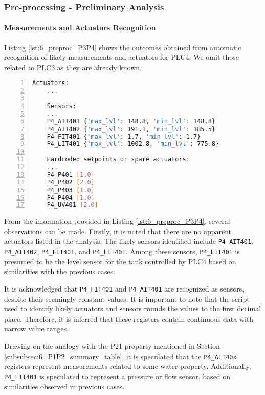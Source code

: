 \subsubsection{Pre-processing - Preliminary Analysis}
\label{subsubsec:6_P3P4_preprocessing}

\paragraph{Measurements and Actuators Recognition}
\label{par:6_P3P4_measures_actuators_recognition}

Listing \ref{lst:6_preproc_P3P4} shows the outcomes obtained from automatic recognition of likely measurements and actuators for PLC4. We omit those related to PLC3 as they are already known.

\begin{lstlisting}[language=bash, numbers=left, caption=Preliminary analysis outcomes for sensors and actuators of \texttt{PLC3-4}, label=lst:6_preproc_P3P4]
	Actuators: 
	...
	
	Sensors: 
	...
	P4_AIT401 {'max_lvl': 148.8, 'min_lvl': 148.8}
	P4_AIT402 {'max_lvl': 191.1, 'min_lvl': 185.5}
	P4_FIT401 {'max_lvl': 1.7, 'min_lvl': 1.7}
	P4_LIT401 {'max_lvl': 1002.8, 'min_lvl': 775.8}
	
	Hardcoded setpoints or spare actuators: 
	...
	P4_P401 [1.0]
	P4_P402 [2.0]
	P4_P403 [1.0]
	P4_P404 [1.0]
	P4_UV401 [2.0]
\end{lstlisting}

From the information provided in Listing \ref{lst:6_preproc_P3P4}, several observations can be made. Firstly, it is noted that there are no apparent actuators listed in the analysis. The likely sensors identified include \texttt{P4\_AIT401}, \texttt{P4\_AIT402}, \texttt{P4\_FIT401}, and \texttt{P4\_LIT401}. Among these sensors, \texttt{P4\_LIT401} is presumed to be the level sensor for the tank controlled by PLC4 based on similarities with the previous cases.

\bigskip
It is acknowledged that \texttt{P4\_FIT401} and \texttt{P4\_AIT401} are recognized as sensors, despite their seemingly constant values. It is important to note that the script used to identify likely actuators and sensors rounds the values to the first decimal place. Therefore, it is inferred that these registers contain continuous data with narrow value ranges.

Drawing on the analogy with the P21 property mentioned in Section \ref{subsubsec:6_P1P2_summary_table}, it is speculated that the \texttt{P4\_AIT40x} registers represent measurements related to some water property. Additionally, \texttt{P4\_FIT401} is speculated to represent a pressure or flow sensor, based on similarities observed in previous cases.

